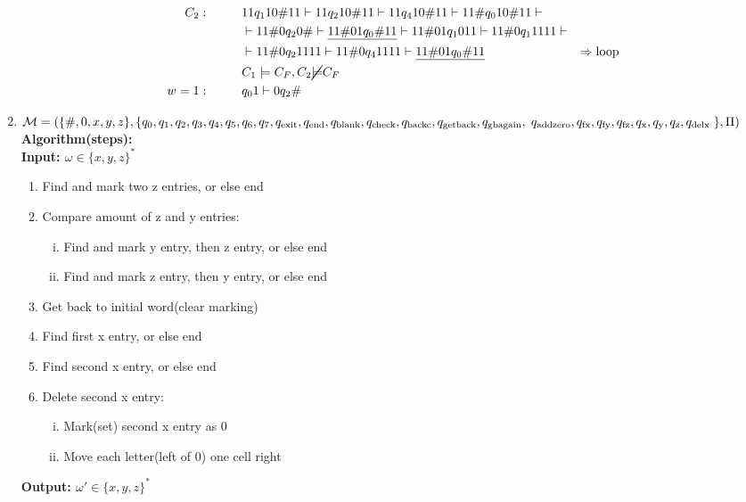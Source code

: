 \documentclass[a4paper,12pt, centered]{article}
\newcommand\tab[1][1cm]{\hspace*{#1}}
\begin{document}
\begin{enumerate}
\begin{align*}
			C_2:\tab&11q_110\#11\vdash11q_210\#11\vdash11q_410\#11\vdash11\#q_010\#11\vdash&\\&\vdash11\#0q_20\#\vdash\underline{11\#01q_0\#11}\vdash11\#01q_1011\vdash11\#0q_11111\vdash&\\&\vdash11\#0q_21111\vdash11\#0q_41111\vdash\underline{11\#01q_0\#11}&\Rightarrow\textrm{loop}\\&C_1\models C_F,C_2\cancel{\models}C_F\\
			w=1:\tab&q_01\vdash0q_2\#
		\end{align*}
		\item $\mathcal{M}=\left(\{\#, 0, x,y,z\},\{q_0,q_1,q_2,q_3,q_4,q_5,q_6,q_7,q_{\textrm{exit}},q_{\textrm{end}},q_{\textrm{blank}},q_{\textrm{check}},q_{\textrm{backc}},q_{\textrm{getback}},q_{\textrm{gbagain}},\right.\\q_{\textrm{addzero}},q_{\textrm{fx}} ,q_{\textrm{fy}},q_{\textrm{fz}},q_{\textrm{x}} ,q_{\textrm{y}},q_{\textrm{z}},q_{\textrm{delx}}     \left.\},\Pi \right) \\$
		\textbf{Algorithm(steps):\\\tab Input: $\omega\in\{x,y,z\}^*$}
		\begin{enumerate}[(1)]
			\item Find and mark two z entries, or else end
			\item Compare amount of z and y entries: \begin{enumerate}[(i)]
			\item Find and mark y entry, then z entry, or else end
			\item Find and mark z entry, then y entry, or else end
		\end{enumerate}
			\item Get back to initial word(clear marking)
			\item Find first x entry, or else end
			\item Find second x entry, or else end
			\item Delete second x entry: \begin{enumerate}[(i)]
			\item Mark(set) second x entry as 0
			\item Move each letter(left of 0) one cell right
		\end{enumerate}
		\end{enumerate}
		\textbf{\tab Output: $\omega'\in\{x,y,z\}^*$}
			\begin{align*}

\end{align*}
\end{enumerate}
\end{document}
